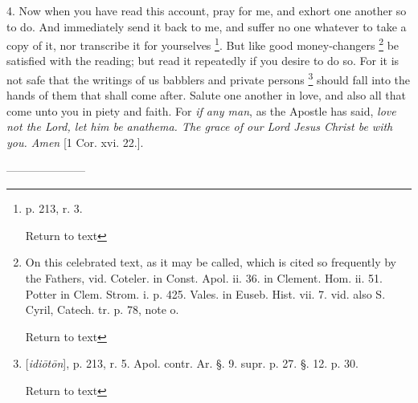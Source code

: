 4. Now when you have read this account, pray for
me, and exhort one another so to do. And immediately send it back to
me, and suffer no one whatever to take a copy of it, nor transcribe it
for yourselves \footnote{p. 213, r. 3.

Return to text}. But
like good money-changers \footnote{On this celebrated text, as it may be called, which is cited so
frequently by the Fathers, vid. Coteler. in Const. Apol. ii. 36. in
Clement. Hom. ii. 51. Potter in Clem. Strom. i. p. 425. Vales. in
Euseb. Hist. vii. 7. vid. also S. Cyril, Catech. tr. p. 78, note o.

Return to text

}
be satisfied with the reading; but read it repeatedly if you desire to
do so. For it is not safe that the writings of us babblers and
private persons \footnote{[\emph{idi\={o}t\={o}n}],
p. 213, r. 5. Apol. contr. Ar. §. 9. supr. p. 27. §. 12. p. 30.

Return to text}
should fall into the hands of them that shall come after. Salute one
another in love, and also all that come unto you in piety and faith.
For \emph{if any man}, as the Apostle has said, \emph{love not the Lord,
let him be anathema. The grace of our Lord Jesus Christ be with you.
Amen} [1 Cor. xvi. 22.].


———————

